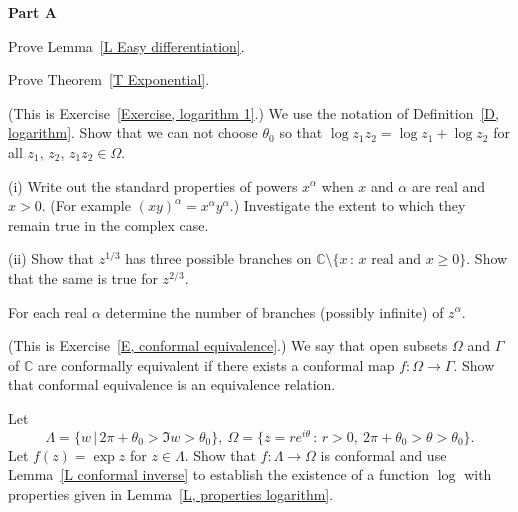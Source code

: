 \pagebreak[3]
\begin{center}
\bf{Part A}
\end{center}

\begin{question} Prove Lemma~\ref{L Easy differentiation}.
\end{question}
\begin{question} Prove Theorem~\ref{T Exponential}.
\end{question}
\begin{question} (This is Exercise~\ref{Exercise, logarithm 1}.)
We use the notation of
Definition~\ref{D, logarithm}. Show that we can not choose
$\theta_{0}$ so that $\log z_{1}z_{2}=\log z_{1}+\log z_{2}$
for all $z_{1}$, $z_{2}$, $z_{1}z_{2}\in\Omega$.
\end{question}
\begin{question} (i) Write out the standard properties of powers
$x^{\alpha}$ when $x$ and $\alpha$ are real and $x>0$.
(For example $(xy)^{\alpha}=x^{\alpha}y^{\alpha}$.)
Investigate the extent to which they remain true
in the complex case.

(ii) Show that $z^{1/3}$ has three possible branches
on ${\mathbb C}\setminus\{x\, :\, \text{$x$ real and $x\geq 0$}\}$.
Show that the same is true for $z^{2/3}$. 

For each real $\alpha$ determine the number of branches
(possibly infinite) of $z^{\alpha}$.
\end{question}
\begin{question} (This is Exercise~\ref{E, conformal equivalence}.) 
We say that open subsets $\Omega$ and $\Gamma$
of ${\mathbb C}$ are conformally equivalent 
if there exists a conformal map $f:\Omega\rightarrow\Gamma$.
Show that conformal equivalence is an equivalence relation.
\end{question}
\begin{question} Let
\[\Lambda=\{w\,|\, 2\pi+\theta_{0}>\Im w>\theta_{0}\},
\ \Omega=\{z=re^{i\theta}\,:\,r>0,
\ 2\pi+\theta_{0}>\theta>\theta_{0}\}.\]
Let $f(z)=\exp z$ for $z\in\Lambda$. Show that 
$f:\Lambda\rightarrow\Omega$ is conformal and use
Lemma~\ref{L conformal inverse} to establish 
the existence of a function $\log$ with properties
given in Lemma~\ref{L, properties logarithm}.
\end{question}

